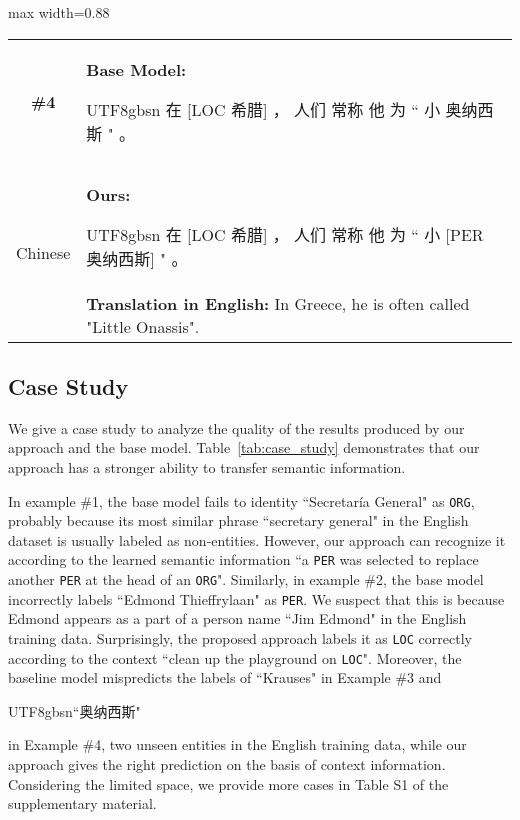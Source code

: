 \documentclass[letterpaper]{article} \usepackage{aaai20}  \usepackage{times}  \usepackage{helvet} \usepackage{courier}  \usepackage[hyphens]{url}  \usepackage{graphicx} \urlstyle{rm} \def\UrlFont{\rm}  \usepackage{graphicx}
\begin{document}
\begin{table*}[t]
\begin{adjustbox}{max width=0.88\textwidth}
\begin{tabular}{|c|l|}
        \textbf{\#4} & \textbf{Base Model: }
        \begin{CJK}{UTF8}{gbsn}
        在 \colorbox[rgb]{0.80, 0.98, 0.85}{[{\scriptsize LOC} 希腊]} ， 人们 常称 他 为 `` 小 \colorbox[rgb]{0.97, 0.82, 0.80}{奥纳西斯} " 。
        \end{CJK}
        \\
\multirow{2}{*}{Chinese} & \textbf{Ours: }
        \begin{CJK}{UTF8}{gbsn}
        在 \colorbox[rgb]{0.80, 0.98, 0.85}{[{\scriptsize LOC} 希腊]} ， 人们 常称 他 为 `` 小 \colorbox[rgb]{0.80, 0.98, 0.85}{[{\scriptsize PER} 奥纳西斯]} " 。
        \end{CJK}
        \\
& \textbf{Translation in English: }\colorbox[rgb]{1, 1, 1}{In Greece, he is often called "Little Onassis".}\\
         
\hline
    
    \end{tabular}
    \end{adjustbox}
    \caption{Case study of cross-lingual NER with minimal resources. The \colorbox[rgb]{0.80, 0.98, 0.85}{GREEN} (\colorbox[rgb]{0.97, 0.82, 0.80}{RED}) highlight indicates a correct (incorrect) label.}
    \label{tab:case_study}
\end{table*} \subsection{Case Study}
We give a case study to analyze the quality of the results produced by our approach and the base model. Table~\ref{tab:case_study} demonstrates that our approach has a stronger ability to transfer semantic information.

In example \#1, the base model fails to identity ``Secretar\'ia General" as \texttt{ORG}, probably because its most similar phrase ``secretary general" in the English dataset is usually labeled as non-entities. 
However, our approach can recognize it according to the learned semantic information ``a \texttt{PER} was selected to replace another \texttt{PER} at the head of an \texttt{ORG}". 
Similarly, in example \#2, the base model incorrectly labels ``Edmond Thieffrylaan" as \texttt{PER}. We suspect that this is because Edmond appears as a part of a person name ``Jim Edmond" in the English training data. Surprisingly, the proposed approach labels it as \texttt{LOC} correctly according to the context ``clean up the playground on \texttt{LOC}". 
Moreover, the baseline model mispredicts the labels of ``Krauses" in Example \#3 and \begin{CJK}{UTF8}{gbsn}``奥纳西斯"\end{CJK}
in Example \#4, two unseen entities in the English training data, while our approach gives the right prediction on the basis of context information. 
Considering the limited space, we provide more cases in Table S1 of the supplementary material. 
\end{document}
